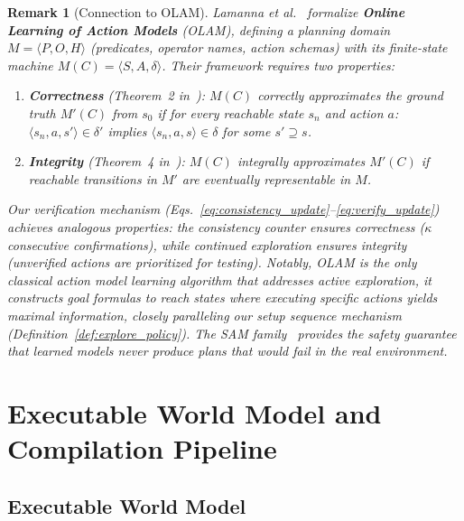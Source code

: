 \documentclass{article}
\newtheorem{remark}{Remark}
\begin{document}
\begin{remark}[Connection to OLAM]
\label{rem:olam}
Lamanna et al.~\cite{lamanna2021olam} formalize \textbf{Online Learning of Action Models} (OLAM), defining a planning domain $M = \langle P, O, H \rangle$ (predicates, operator names, action schemas) with its finite-state machine $M(C) = \langle S, A, \delta \rangle$.  Their framework requires two properties:
\begin{enumerate}[nosep]
    \item \textbf{Correctness} (Theorem~2 in~\cite{lamanna2021olam}): $M(C)$ correctly approximates the ground truth $M'(C)$ from $s_0$ if for every reachable state $s_n$ and action $a$: $\langle s_n, a, s' \rangle \in \delta'$ implies $\langle s_n, a, s \rangle \in \delta$ for some $s' \supseteq s$.
    \item \textbf{Integrity} (Theorem~4 in~\cite{lamanna2021olam}): $M(C)$ integrally approximates $M'(C)$ if reachable transitions in $M'$ are eventually representable in $M$.
\end{enumerate}
Our verification mechanism (Eqs.~\ref{eq:consistency_update}--\ref{eq:verify_update}) achieves analogous properties: the consistency counter ensures correctness ($\kappa$ consecutive confirmations), while continued exploration ensures integrity (unverified actions are prioritized for testing).  Notably, OLAM is the only classical action model learning algorithm that addresses \emph{active exploration}, it constructs goal formulas to reach states where executing specific actions yields maximal information, closely paralleling our setup sequence mechanism (Definition~\ref{def:explore_policy}).  The SAM family~\cite{juba2021safe, le2024pisam, mordoch2024csam} provides the safety guarantee that learned models never produce plans that would fail in the real environment.
\end{remark}



\section{Executable World Model and Compilation Pipeline}
\label{sec:executable_model}

\subsection{Executable World Model}
\label{sec:exec_model_def}
\end{document}
